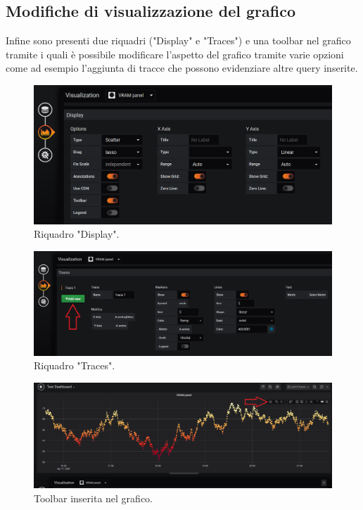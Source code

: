     \subsection{Modifiche di visualizzazione del grafico}
        Infine sono presenti due riquadri ("Display" e "Traces") e una toolbar nel grafico tramite i quali è possibile modificare l'aspetto del grafico tramite varie opzioni come ad esempio l'aggiunta di tracce che possono evidenziare altre query inserite.
        \begin{figure}[H]
            \includegraphics[width=\textwidth,height=\textheight,keepaspectratio]{img/display.png}
            \caption{Riquadro "Display".}
        \end{figure}
        \begin{figure}[H]
            \includegraphics[width=\textwidth,height=\textheight,keepaspectratio]{img/traces.png}
            \caption{Riquadro "Traces".}
        \end{figure}
        \begin{figure}[H]
            \includegraphics[width=\textwidth,height=\textheight,keepaspectratio]{img/toolbar.png}
            \caption{Toolbar inserita nel grafico.}
        \end{figure}